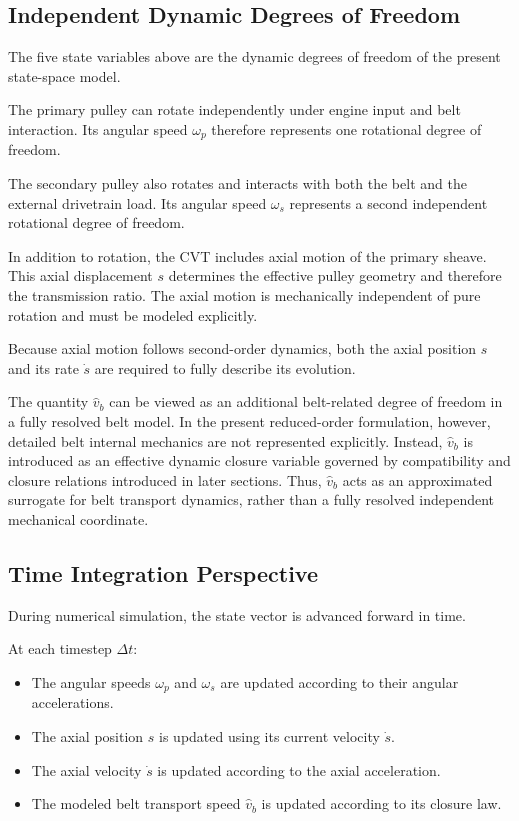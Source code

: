 \documentclass[11pt]{article}
\numberwithin{equation}{section}
\begin{document}
\subsection{Independent Dynamic Degrees of Freedom}

The five state variables above are the dynamic degrees of freedom of the
present state-space model.

The primary pulley can rotate independently under engine input and belt interaction. 
Its angular speed $\omega_p$ therefore represents one rotational degree of freedom.

The secondary pulley also rotates and interacts with both the belt and the external 
drivetrain load. Its angular speed $\omega_s$ represents a second independent 
rotational degree of freedom.

In addition to rotation, the CVT includes axial motion of the primary sheave. 
This axial displacement $s$ determines the effective pulley geometry and therefore 
the transmission ratio. The axial motion is mechanically independent of pure rotation 
and must be modeled explicitly.

Because axial motion follows second-order dynamics, both the axial position $s$ 
and its rate $\dot{s}$ are required to fully describe its evolution.

The quantity $\hat{v}_b$ can be viewed as an additional belt-related degree of
freedom in a fully resolved belt model. In the present reduced-order
formulation, however, detailed belt internal mechanics are not represented
explicitly. Instead, $\hat{v}_b$ is introduced as an effective dynamic closure
variable governed by compatibility and closure relations introduced in later
sections. Thus,
$\hat{v}_b$ acts as an approximated surrogate for belt transport dynamics,
rather than a fully resolved independent mechanical coordinate.

\subsection{Time Integration Perspective}

During numerical simulation, the state vector is advanced forward in time.

At each timestep $\Delta t$:

\begin{itemize}
    \item The angular speeds $\omega_p$ and $\omega_s$ are updated according 
    to their angular accelerations.

    \item The axial position $s$ is updated using its current velocity $\dot{s}$.

    \item The axial velocity $\dot{s}$ is updated according to the axial acceleration.
    
    \item The modeled belt transport speed $\hat{v}_b$ is updated according
    to its closure law.
\end{itemize}
\end{document}
